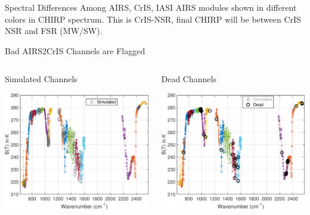 \documentclass[10pt,t]{beamer}
\begin{document}
\begin{frame}[label={sec:org465e899}]{Spectral Differences Among AIRS, CrIS, IASI}
AIRS modules shown in different colors in CHIRP spectrum. This is CrIS-NSR, final CHIRP will be between CrIS NSR and FSR (MW/SW).
\end{frame}

\begin{frame}[label={sec:org7dc76f6}]{Bad AIRS2CrIS Channels are Flagged}
\vspace{-0.35in}
\begin{columns}
\begin{column}{0.55\columnwidth}
\begin{block}{\footnotesize Simulated Channels}
\vspace{-0.05in}
\vspace{-0.05in}
\begin{center}
\includegraphics[width=0.77\linewidth]{./Figs/Pdf/a2c_full_show_sim.pdf}
\end{center}
\end{block}
\end{column}

\begin{column}{0.55\columnwidth}
\begin{block}{\footnotesize Dead Channels}
\vspace{-0.05in}
\vspace{-0.05in}
\begin{center}
\includegraphics[width=0.77\linewidth]{./Figs/Pdf/a2c_full_show_dead.pdf}
\end{center}
\end{block}
\end{column}
\end{columns}


\end{frame}
\end{document}
